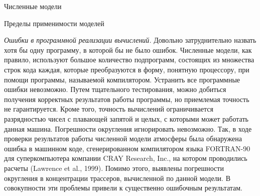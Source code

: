 \begin{chapter}{Численные модели}
\begin{section}{Пределы применимости моделей}

\emph{Ошибки в программной реализации вычислений.} 
Довольно затруднительно назвать хотя бы одну программу, в которой бы не было
ошибок. Численные модели, как правило, используют большое количество 
подпрограмм, состоящих из множества строк кода каждая, которые преобразуются
в форму, понятную процессору, при помощи программы, называемой компилятором.
Устранить все программные ошибки невозможно. Путем тщательного тестирования,
можно добиться получения корректных результатов работы программы, но 
приемлемая точность не гарантируется.
Кроме того, точность вычислений ограничивается разрядностью чисел с плавающей 
запятой и целых, с которыми может работать данная машина. 
Погрешности округления игнорировать невозможно. 
Так, в ходе проверки результатов работы численной модели атмосферы была 
обнаружена ошибка в машинном коде, сгенерированном компилятором языка
FORTRAN-90 для суперкомпьютера компании CRAY Research, Inc., на котором
проводились расчеты (Lawrence et al., 1999). Помимо этого, выявлены 
погрешности округления в концентрации трассеров, вычисленной по данной модели. 
В совокупности эти проблемы привели к существенно ошибочным результатам.
%


\end{section}
\end{chapter}
